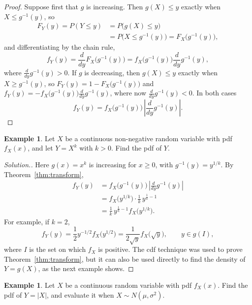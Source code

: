\documentclass[11pt,a4paper]{article}
\theoremstyle{definition}
\newtheorem{exa}[thm]{Example}
\newenvironment{solution}
  {\renewcommand{\qedsymbol}{}\begin{proof}[\textit{Solution}.]}
  {\end{proof}}
\begin{document}
\begin{proof}
Suppose first that $g$ is increasing. Then $g(X) \le y$ exactly when $X \le g^{-1}(y)$, so
\begin{align*}
F_Y(y) = P(Y \le y) &= P\bigl(g(X) \le y\bigr) \\
&= P\bigl(X \le g^{-1}(y)\bigr) = F_X\bigl(g^{-1}(y)\bigr) ,
\end{align*}
and differentiating by the chain rule,
\[
f_Y(y) = \frac{d}{dy}F_X\bigl(g^{-1}(y)\bigr) = f_X\bigl(g^{-1}(y)\bigr)\frac{d}{dy}g^{-1}(y) ,
\]
where $\frac{d}{dy}g^{-1}(y) > 0$. If $g$ is decreasing, then $g(X) \le y$ exactly when $X \ge g^{-1}(y)$, so $F_Y(y) = 1 - F_X\bigl(g^{-1}(y)\bigr)$ and
$f_Y(y) = -f_X\bigl(g^{-1}(y)\bigr)\frac{d}{dy}g^{-1}(y)$, where now $\frac{d}{dy}g^{-1}(y) < 0$. In both cases
\[
f_Y(y) = f_X\bigl(g^{-1}(y)\bigr)\,\left|\frac{d}{dy}g^{-1}(y)\right| .
\]
\end{proof}

\begin{exa}\label{exa:power}
Let $X$ be a continuous non-negative random variable with pdf $f_X(x)$, and let $Y = X^k$ with $k > 0$. Find the pdf of $Y$.
\end{exa}

\begin{solution}
Here $g(x) = x^k$ is increasing for $x \ge 0$, with $g^{-1}(y) = y^{1/k}$. By Theorem~\ref{thm:transform},
\begin{align*}
f_Y(y) &= f_X\bigl(g^{-1}(y)\bigr)\,\left|\frac{d}{dy}g^{-1}(y)\right| \\
&= f_X\bigl(y^{1/k}\bigr)\cdot\frac1k\,y^{\frac1k - 1} \\
&= \frac1k\,y^{\frac1k - 1}f_X\bigl(y^{1/k}\bigr) .
\end{align*}
For example, if $k = 2$,
\[
f_Y(y) = \frac12y^{-1/2}f_X\bigl(y^{1/2}\bigr) = \frac{1}{2\sqrt y}f_X\bigl(\sqrt y\bigr) , \qquad y \in g(I) ,
\]
where $I$ is the set on which $f_X$ is positive. The cdf technique was used to prove Theorem~\ref{thm:transform}, but it can also be used
directly to find the density of $Y = g(X)$, as the next example shows.
\end{solution}

\begin{exa}\label{exa:abs}
Let $X$ be a continuous random variable with pdf $f_X(x)$. Find the pdf of $Y = |X|$, and evaluate it when $X \sim N(\mu, \sigma^2)$.
\end{exa}
\end{document}
